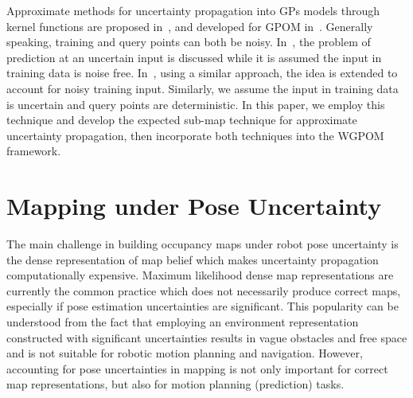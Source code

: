 \documentclass[letterpaper, 10 pt, journal, twoside]{IEEEtran}  %
\begin{document}
Approximate methods for uncertainty propagation into GPs models through kernel functions are proposed in~\cite{girard2004approximate}, and developed for GPOM in~\cite{o2010contextual}. 
Generally speaking, training and query points can both be noisy. In~\cite{girard2004approximate}, the problem of prediction at an uncertain input is discussed while it is assumed the input in training data is noise free. In~\cite{o2010contextual}, using a similar approach, the idea is extended to account for noisy training input. Similarly, we assume the input in training data is uncertain and query points are deterministic. In this paper, we employ this technique and develop the expected sub-map technique for approximate uncertainty propagation, then incorporate both techniques into the WGPOM framework.

\section{Mapping under Pose Uncertainty}
\label{sec:uncertainpose}
The main challenge in building occupancy maps under robot pose uncertainty is the dense representation of map belief which makes uncertainty propagation computationally expensive. Maximum likelihood dense map representations are currently the common practice which does not necessarily produce correct maps, especially if pose estimation uncertainties are significant. This popularity can be understood from the fact that employing an environment representation constructed with significant uncertainties results in vague obstacles and free space and is not suitable for robotic motion planning and navigation. However, accounting for pose uncertainties in mapping is not only important for correct map representations, but also for motion planning (prediction) tasks.
\end{document}
